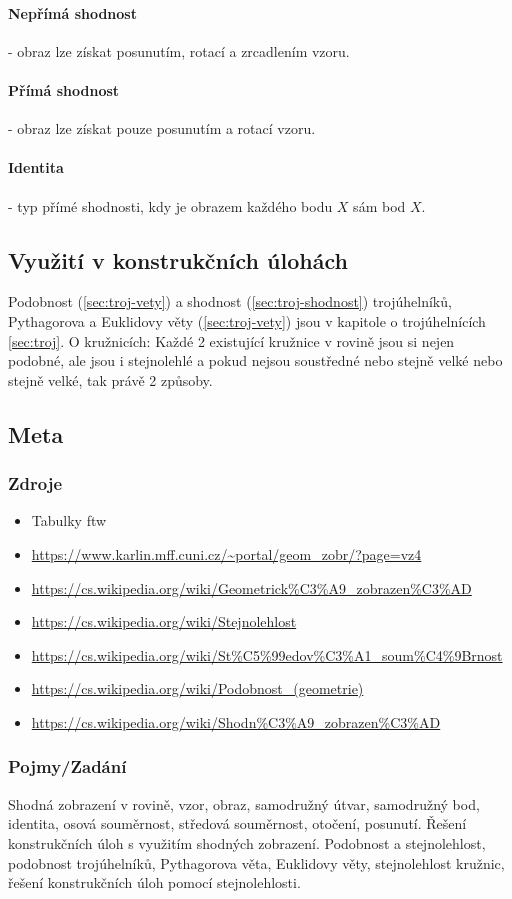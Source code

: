 \documentclass[12pt]{article}
\begin{document}
\paragraph{Nepřímá shodnost} - obraz lze získat posunutím, rotací a zrcadlením vzoru.
\paragraph{Přímá shodnost} - obraz lze získat pouze posunutím a rotací vzoru.
\paragraph{Identita} - typ přímé shodnosti, kdy je obrazem každého bodu $X$ sám bod $X$.
\subsection{Využití v konstrukčních úlohách}
Podobnost (\ref{sec:troj-vety}) a shodnost (\ref{sec:troj-shodnost}) trojúhelníků, Pythagorova a Euklidovy věty (\ref{sec:troj-vety}) jsou v kapitole o trojúhelnících \ref{sec:troj}. O kružnicích: Každé 2 existující kružnice v rovině jsou si nejen podobné, ale jsou i stejnolehlé a pokud nejsou soustředné nebo stejně velké nebo stejně velké, tak právě 2 způsoby.
\subsection{Meta}
\subsubsection{Zdroje}
\begin{itemize}
\item Tabulky ftw
\item \url{https://www.karlin.mff.cuni.cz/~portal/geom_zobr/?page=vz4}
\item \url{https://cs.wikipedia.org/wiki/Geometrick\%C3\%A9_zobrazen\%C3\%AD}
\item \url{https://cs.wikipedia.org/wiki/Stejnolehlost}
\item \url{https://cs.wikipedia.org/wiki/St\%C5\%99edov\%C3\%A1_soum\%C4\%9Brnost}
\item \url{https://cs.wikipedia.org/wiki/Podobnost_(geometrie)}
\item \url{https://cs.wikipedia.org/wiki/Shodn\%C3\%A9_zobrazen\%C3\%AD}
\end{itemize}

\subsubsection{Pojmy/Zadání}
Shodná zobrazení v rovině, vzor, obraz, samodružný útvar, samodružný bod, identita, osová souměrnost, středová souměrnost, otočení, posunutí. Řešení konstrukčních úloh s využitím shodných zobrazení. Podobnost a stejnolehlost, podobnost trojúhelníků, Pythagorova věta, Euklidovy věty, stejnolehlost kružnic, řešení konstrukčních úloh pomocí stejnolehlosti.
\end{document}
